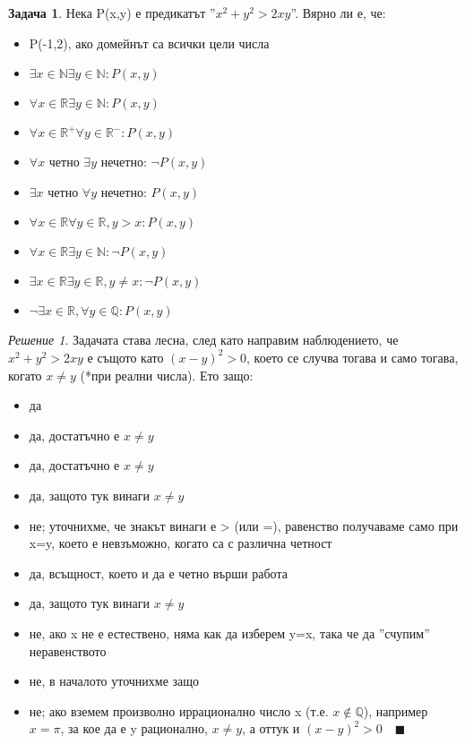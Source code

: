\documentclass[10pt, a4paper]{article}
\theoremstyle{definition}
\newtheorem{problem}{Задача}
\theoremstyle{remark}
\newtheorem*{sol}{Решение}
\begin{document}
\hfill
\begin{problem}
    Нека P(x,y) е предикатът ''\(x^2+y^2>2xy\)''. Вярно ли е, че:
    \begin{itemize}
        \item P(-1,2), ако домейнът са всички цели числа
        \item \(\exists x \in \mathbb{N} \exists y \in \mathbb{N}:P(x,y)\)
        \item \(\forall x \in \mathbb{R} \exists y \in \mathbb{N}:P(x,y)\)
        \item \(\forall x \in \mathbb{R^+} \forall y \in \mathbb{R^-}:P(x,y)\)
        \item \(\forall x\) четно \(\exists y\) нечетно: \(\neg P(x,y)\)
        \item \(\exists x\) четно \(\forall y\) нечетно: \(P(x,y)\)
        \item \(\forall x \in \mathbb{R} \forall y \in \mathbb{R}, y>x: P(x,y)\)
        \item \(\forall x \in \mathbb{R} \exists y \in \mathbb{N}:\neg P(x,y)\)
        \item \(\exists x \in \mathbb{R} \exists y \in \mathbb{R}, y\neq x:\neg P(x,y)\)
        \item \(\neg\exists x \in \mathbb{R}, \forall y \in \mathbb{Q}:P(x,y)\)
    \end{itemize}
\end{problem}
\begin{sol}
    Задачата става лесна, след като направим наблюдението, че \(x^2+y^2>2xy\) е същото като \((x-y)^2>0\), което се случва тогава и само тогава, когато \(x\neq y\) (*при реални числа). Ето защо:
    \begin{itemize}
        \item да
        \item да, достатъчно е \(x\neq y\)
        \item да, достатъчно е \(x\neq y\)
        \item да, защото тук винаги \(x\neq y\)
        \item не; уточнихме, че знакът винаги е > (или =), равенство получаваме само при x=y, което е невзъможно, когато са с различна четност
        \item да, всъщност, което и да е четно върши работа
        \item да, защото тук винаги \(x\neq y\)
        \item не, ако x не е естествено, няма как да изберем y=x, така че да ''счупим'' неравенството
        \item не, в началото уточнихме защо
        \item не; ако вземем произволно иррационално число x (т.е. \(x \notin \mathbb{Q}\)), например \(x=\pi\), за кое да е y рационално, \(x\neq y\), а оттук и \((x-y)^2>0\quad\blacksquare\)
        
    \end{itemize}
    
\end{sol}
\end{document}
